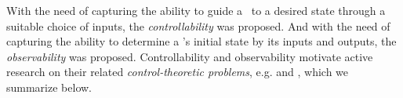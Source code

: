 With the need of capturing the ability to guide a \BCN\ to a desired state through a suitable choice of inputs, the {\em controllability} was proposed. And with the need of capturing the ability to determine a \BCN's initial state by its inputs and outputs, the {\em observability}  was proposed. Controllability and observability motivate active research on their related {\em control-theoretic problems}, e.g.  \cite{cheng2009controllability, Zhao2010Input, Cheng2011Identification, Cheng2011Analysis} and \cite{Fornasini2013Observability}, which we summarize below.







